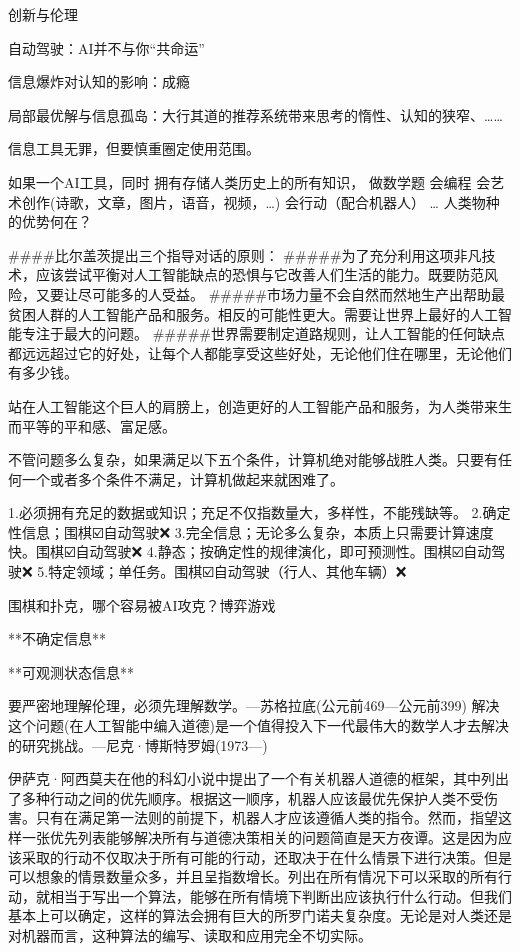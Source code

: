 创新与伦理

自动驾驶：AI并不与你“共命运”

信息爆炸对认知的影响：成瘾

局部最优解与信息孤岛：大行其道的推荐系统带来思考的惰性、认知的狭窄、……

信息工具无罪，但要慎重圈定使用范围。


如果一个AI工具，同时
拥有存储人类历史上的所有知识，
做数学题
会编程
会艺术创作(诗歌，文章，图片，语音，视频，…)
会行动（配合机器人）
…
人类物种的优势何在？

####比尔盖茨提出三个指导对话的原则：
#####为了充分利用这项非凡技术，应该尝试平衡对人工智能缺点的恐惧与它改善人们生活的能力。既要防范风险，又要让尽可能多的人受益。
#####市场力量不会自然而然地生产出帮助最贫困人群的人工智能产品和服务。相反的可能性更大。需要让世界上最好的人工智能专注于最大的问题。
#####世界需要制定道路规则，让人工智能的任何缺点都远远超过它的好处，让每个人都能享受这些好处，无论他们住在哪里，无论他们有多少钱。

站在人工智能这个巨人的肩膀上，创造更好的人工智能产品和服务，为人类带来生而平等的平和感、富足感。


不管问题多么复杂，如果满足以下五个条件，计算机绝对能够战胜人类。只要有任何一个或者多个条件不满足，计算机做起来就困难了。

1.必须拥有充足的数据或知识；充足不仅指数量大，多样性，不能残缺等。
2.确定性信息；围棋☑️自动驾驶❌
3.完全信息；无论多么复杂，本质上只需要计算速度快。围棋☑️自动驾驶❌
4.静态；按确定性的规律演化，即可预测性。围棋☑️自动驾驶❌
5.特定领域；单任务。围棋☑️自动驾驶（行人、其他车辆）❌








围棋和扑克，哪个容易被AI攻克？博弈游戏



**不确定信息**



**可观测状态信息**



要严密地理解伦理，必须先理解数学。---苏格拉底(公元前469—公元前399)
解决这个问题(在人工智能中编入道德)是一个值得投入下一代最伟大的数学人才去解决的研究挑战。---尼克·博斯特罗姆(1973—)



伊萨克·阿西莫夫在他的科幻小说中提出了一个有关机器人道德的框架，其中列出了多种行动之间的优先顺序。根据这一顺序，机器人应该最优先保护人类不受伤害。只有在满足第一法则的前提下，机器人才应该遵循人类的指令。然而，指望这样一张优先列表能够解决所有与道德决策相关的问题简直是天方夜谭。这是因为应该采取的行动不仅取决于所有可能的行动，还取决于在什么情景下进行决策。但是可以想象的情景数量众多，并且呈指数增长。列出在所有情况下可以采取的所有行动，就相当于写出一个算法，能够在所有情境下判断出应该执行什么行动。但我们基本上可以确定，这样的算法会拥有巨大的所罗门诺夫复杂度。无论是对人类还是对机器而言，这种算法的编写、读取和应用完全不切实际。

